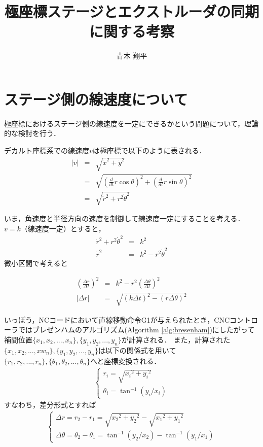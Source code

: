 \documentclass[twocolumn,oneside,a4paper]{article}
\title{極座標ステージとエクストルーダの同期に関する考察}
\author{青木 翔平}
\begin{document}
\maketitle

\section{ステージ側の線速度について}
極座標におけるステージ側の線速度を一定にできるかという問題について，理論的な検討を行う．

デカルト座標系での線速度$v$は極座標で以下のように表される．
\begin{eqnarray}
|v| &=& \sqrt{\dot{x}^2 + \dot{y}^2} \nonumber \\
  &=& \sqrt{ \left(\frac{d}{dt} r \cos\theta \right) ^2 + \left(\frac{d}{dt}r \sin\theta\right) ^2} \nonumber \\
  &=& \sqrt{ \dot{r}^2+ r^2 \dot{\theta}^2 }
\end{eqnarray}    
    
いま，角速度と半径方向の速度を制御して線速度一定にすることを考える．
$v=k$（線速度一定）とすると，
\begin{eqnarray}\label{eq:vdef}
  \dot{r}^2+ r^2 \dot{\theta}^2 &=& k^2 \\
  \dot{r}^2 &=&  k^2 - r^2 \dot{\theta}^2
\end{eqnarray}
微小区間で考えると

\begin{eqnarray}\label{eq:deltar}
     \left( \frac{\Delta r}{\Delta t}\right)^2 &=&  k^2 - r^2 \left( \frac{\Delta \theta}{\Delta t}\right)^2 \nonumber \\
|\Delta r| &=& \sqrt{(k \Delta t)^2 - (r \Delta \theta)^2}
\end{eqnarray}

いっぽう，NCコードにおいて直線移動命令G1が与えられたとき，CNCコントローラではブレゼンハムのアルゴリズム(Algorithm \ref{alg:bresenham})にしたがって補間位置$\{x_1,x_2,...,x_n\},\{y_1,y_2,...,y_n\}$が計算される．
また，計算された$\{x_1,x_2,...,xw_n\},\{y_1,y_2,...,y_n\}$は以下の関係式を用いて$\{r_1,r_2,...,r_n\},\{\theta_1,\theta_2,...,\theta_n\}$へと座標変換される．　
\begin{eqnarray*}
\left\{
  \begin{array}{ll}
r_i = \sqrt{{x_i}^2+{y_i}^2} \\    
\theta_i = \tan^{-1} (y_i / x_i)
  \end{array}
  \right.
\end{eqnarray*}
すなわち，差分形式とすれば
\begin{eqnarray}\label{eq:diff}
\left\{
  \begin{array}{ll}
\Delta r = r_2-r_1 = \sqrt{{x_2}^2+{y_2}^2} - \sqrt{{x_1}^2+{y_1}^2} \\    
\Delta \theta = \theta_2-\theta_1 = \tan^{-1} (y_2 / x_2) - \tan^{-1} (y_1 / x_1)
  \end{array}
  \right.
\end{eqnarray}
\end{document}

